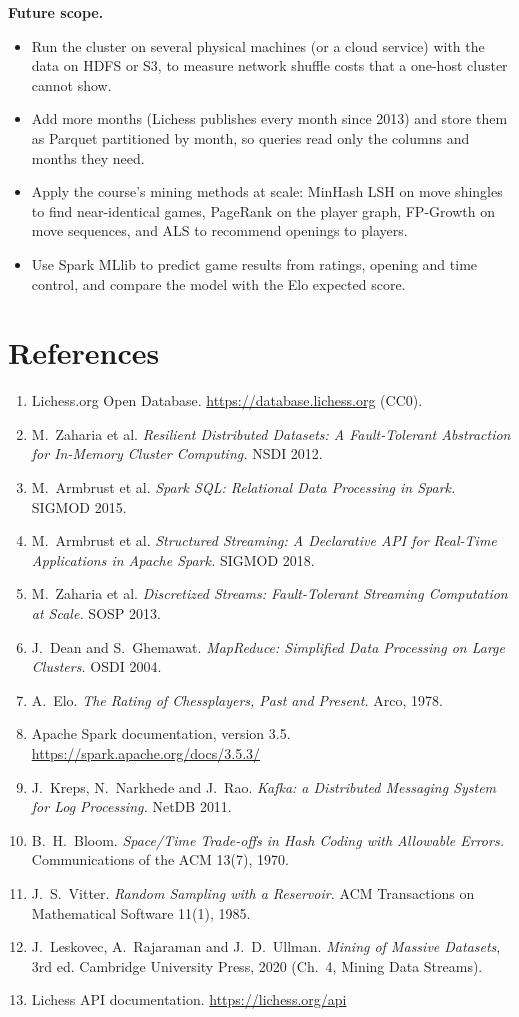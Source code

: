 \documentclass[11pt,a4paper]{article}
\begin{document}
\textbf{Future scope.}
\begin{itemize}\itemsep0pt
\item Run the cluster on several physical machines (or a cloud service) with the data on
HDFS or S3, to measure network shuffle costs that a one-host cluster cannot show.
\item Add more months (Lichess publishes every month since 2013) and store them as Parquet
partitioned by month, so queries read only the columns and months they need.
\item Apply the course's mining methods at scale: MinHash LSH on move shingles to find
near-identical games, PageRank on the player graph, FP-Growth on move sequences, and ALS to
recommend openings to players.
\item Use Spark MLlib to predict game results from ratings, opening and time control, and
compare the model with the Elo expected score.
\end{itemize}

\section*{References}
\begin{small}\begin{enumerate}\itemsep1pt
\item Lichess.org Open Database. \url{https://database.lichess.org} (CC0).
\item M.~Zaharia et al. \emph{Resilient Distributed Datasets: A Fault-Tolerant Abstraction
for In-Memory Cluster Computing.} NSDI 2012.
\item M.~Armbrust et al. \emph{Spark SQL: Relational Data Processing in Spark.} SIGMOD 2015.
\item M.~Armbrust et al. \emph{Structured Streaming: A Declarative API for Real-Time
Applications in Apache Spark.} SIGMOD 2018.
\item M.~Zaharia et al. \emph{Discretized Streams: Fault-Tolerant Streaming Computation at
Scale.} SOSP 2013.
\item J.~Dean and S.~Ghemawat. \emph{MapReduce: Simplified Data Processing on Large
Clusters.} OSDI 2004.
\item A.~Elo. \emph{The Rating of Chessplayers, Past and Present.} Arco, 1978.
\item Apache Spark documentation, version 3.5. \url{https://spark.apache.org/docs/3.5.3/}
\item J.~Kreps, N.~Narkhede and J.~Rao. \emph{Kafka: a Distributed Messaging System for Log
Processing.} NetDB 2011.
\item B.~H.~Bloom. \emph{Space/Time Trade-offs in Hash Coding with Allowable Errors.}
Communications of the ACM 13(7), 1970.
\item J.~S.~Vitter. \emph{Random Sampling with a Reservoir.} ACM Transactions on Mathematical
Software 11(1), 1985.
\item J.~Leskovec, A.~Rajaraman and J.~D.~Ullman. \emph{Mining of Massive Datasets}, 3rd ed.
Cambridge University Press, 2020 (Ch.~4, Mining Data Streams).
\item Lichess API documentation. \url{https://lichess.org/api}
\end{enumerate}\end{small}
\end{document}
